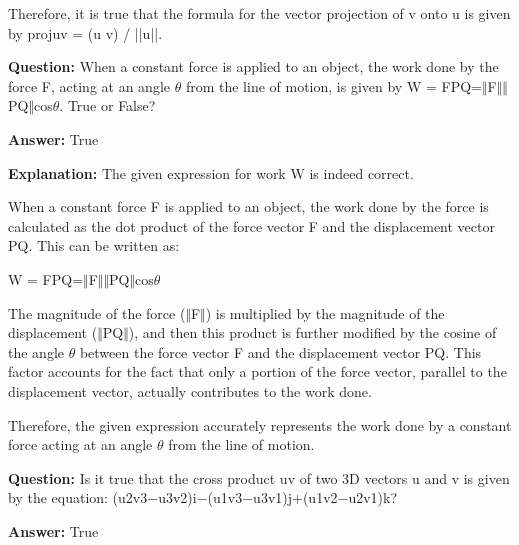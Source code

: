 \documentclass{article}
\begin{document}
Therefore, it is true that the formula for the vector projection of v onto u is given by projuv = (u {\textperiodcentered} v) / ||u||.
                
                \vspace{0.5cm} 
        
            
                \textbf {Question:} When a constant force is applied to an object, the work done by the force F, acting at an angle \ensuremath{\theta} from the line of motion, is given by W = F{\textperiodcentered}PQ{\textrightarrow}=\ensuremath{\Vert}F\ensuremath{\Vert}\ensuremath{\Vert}PQ{\textrightarrow}\ensuremath{\Vert}cos\ensuremath{\theta}. True or False?
                
                \textbf{Answer:} True

                \textbf{Explanation:} The given expression for work W is indeed correct.

When a constant force F is applied to an object, the work done by the force is calculated as the dot product of the force vector F and the displacement vector PQ. This can be written as:

W = F{\textperiodcentered}PQ{\textrightarrow}=\ensuremath{\Vert}F\ensuremath{\Vert}\ensuremath{\Vert}PQ{\textrightarrow}\ensuremath{\Vert}cos\ensuremath{\theta}

The magnitude of the force (\ensuremath{\Vert}F\ensuremath{\Vert}) is multiplied by the magnitude of the displacement (\ensuremath{\Vert}PQ{\textrightarrow}\ensuremath{\Vert}), and then this product is further modified by the cosine of the angle \ensuremath{\theta} between the force vector F and the displacement vector PQ. This factor accounts for the fact that only a portion of the force vector, parallel to the displacement vector, actually contributes to the work done.

Therefore, the given expression accurately represents the work done by a constant force acting at an angle \ensuremath{\theta} from the line of motion.
                
                \vspace{0.5cm} 
        
            
                \textbf {Question:} Is it true that the cross product u{\texttimes}v of two 3D vectors u and v is given by the equation: (u2v3\ensuremath{-}u3v2)i\ensuremath{-}(u1v3\ensuremath{-}u3v1)j+(u1v2\ensuremath{-}u2v1)k?
                
                \textbf{Answer:} True
\end{document}
